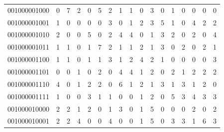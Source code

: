\documentclass[10pt,a4paper]{article}
\begin{document}
\begin{longtable}{ |c|c|c|c|c|c|c|c|c|c|c|c|c|c|c|c|c| }
    001000001000              & 0                            & 7                                & 2                            & 0                              & 5   & 2   & 1   & 1   & 0   & 3   & 0   & 1   & 0   & 0   & 0   & 0   \\
    001000001001              & 1                            & 0                                & 0                            & 0                              & 0   & 3   & 0   & 1   & 2   & 3   & 5   & 1   & 0   & 4   & 2   & 2   \\
    001000001010              & 2                            & 0                                & 0                            & 5                              & 0   & 2   & 4   & 4   & 0   & 1   & 3   & 2   & 0   & 2   & 0   & 4   \\
    001000001011              & 1                            & 1                                & 0                            & 1                              & 7   & 2   & 1   & 1   & 2   & 1   & 3   & 0   & 2   & 0   & 2   & 1   \\
    001000001100              & 1                            & 1                                & 0                            & 1                              & 1   & 3   & 1   & 2   & 4   & 2   & 1   & 0   & 0   & 0   & 0   & 3   \\
    001000001101              & 0                            & 0                                & 1                            & 0                              & 2   & 0   & 4   & 4   & 1   & 2   & 0   & 2   & 1   & 2   & 2   & 2   \\
    001000001110              & 4                            & 0                                & 1                            & 2                              & 2   & 0   & 6   & 1   & 2   & 1   & 3   & 1   & 3   & 1   & 2   & 0   \\
    001000001111              & 1                            & 0                                & 0                            & 3                              & 1   & 1   & 0   & 0   & 1   & 2   & 0   & 5   & 3   & 4   & 3   & 3   \\
    001000010000              & 2                            & 2                                & 1                            & 2                              & 0   & 1   & 3   & 0   & 1   & 5   & 0   & 0   & 0   & 2   & 0   & 2   \\
    001000010001              & 2                            & 2                                & 4                            & 0                              & 0   & 4   & 0   & 0   & 1   & 5   & 0   & 3   & 3   & 1   & 6   & 3   \\

\end{longtable}
\end{document}

